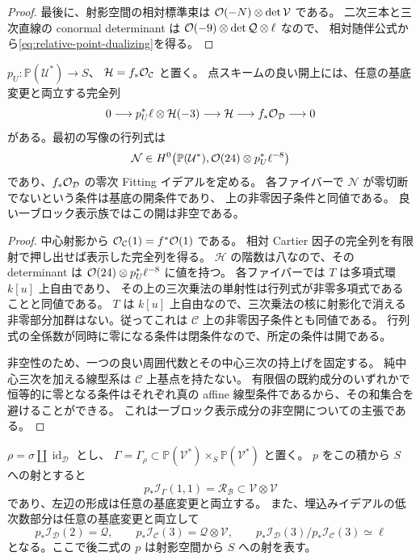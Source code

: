 \begin{proof}
最後に、射影空間の相対標準束は
$\mathcal O(-N)\otimes\det\mathcal V$ である。
二次三本と三次直線の conormal determinant は
$\mathcal O(-9)\otimes\det\mathcal Q\otimes\ell$ なので、
相対随伴公式から\eqref{eq:relative-point-dualizing}を得る。
\end{proof}

\begin{corollary}
\label{cor:relative-point-norm}
$p_U:\mathbb P(\mathcal U^*)\to S$、
$\mathcal H=f_*\mathcal O_{\mathcal C}$ と置く。
点スキームの良い開上には、任意の基底変更と両立する完全列
\[
 0\longrightarrow p_U^*\ell\otimes\mathcal H(-3)
 \longrightarrow\mathcal H
 \longrightarrow f_*\mathcal O_{\mathcal D}\longrightarrow0
\]
がある。最初の写像の行列式は
\[
 \mathcal N\in
 H^0\bigl(\mathbb P(\mathcal U^*),
       \mathcal O(24)\otimes p_U^*\ell^{-8}\bigr)
\]
であり、$f_*\mathcal O_{\mathcal D}$ の零次 Fitting イデアルを定める。
各ファイバーで $\mathcal N$ が零切断でないという条件は基底の開条件であり、
上の非零因子条件と同値である。
良い一ブロック表示族ではこの開は非空である。
\end{corollary}

\begin{proof}
中心射影から $\mathcal O_{\mathcal C}(1)=f^*\mathcal O(1)$ である。
相対 Cartier 因子の完全列を有限射で押し出せば表示した完全列を得る。
$\mathcal H$ の階数は八なので、その determinant は
$\mathcal O(24)\otimes p_U^*\ell^{-8}$ に値を持つ。
各ファイバーでは $T$ は多項式環 $k[u]$ 上自由であり、
その上の三次乗法の単射性は行列式が非零多項式であることと同値である。
$T$ は $k[u]$ 上自由なので、三次乗法の核に射影化で消える
非零部分加群はない。従ってこれは $\mathcal C$ 上の非零因子条件とも同値である。
行列式の全係数が同時に零になる条件は閉条件なので、所定の条件は開である。

非空性のため、一つの良い周囲代数とその中心三次の持上げを固定する。
純中心三次を加える線型系は $\mathcal C$ 上基点を持たない。
有限個の既約成分のいずれかで恒等的に零となる条件はそれぞれ真の affine
線型条件であるから、その和集合を避けることができる。
これは一ブロック表示成分の非空開についての主張である。
\end{proof}

\begin{proposition}[相対点対応からの二次包絡]
\label{prop:relative-point-envelope}
$\rho=\sigma\amalg\operatorname{id}_{\mathcal D}$ とし、
$\Gamma=\Gamma_\rho\subset
\mathbb P(\mathcal V^*)\times_S\mathbb P(\mathcal V^*)$ と置く。
$p$ をこの積から $S$ への射とすると
\begin{equation}\label{eq:relative-point-envelope}
 p_*\mathcal I_\Gamma(1,1)=\mathcal R_{\mathcal B}
 \subset\mathcal V\otimes\mathcal V
\end{equation}
であり、左辺の形成は任意の基底変更と両立する。
また、埋込みイデアルの低次数部分は任意の基底変更と両立して
\begin{equation}\label{eq:relative-point-ideal-pieces}
 p_*\mathcal I_{\mathcal D}(2)=\mathcal Q,
 \qquad
 p_*\mathcal I_{\mathcal C}(3)=\mathcal Q\otimes\mathcal V,
 \qquad
 p_*\mathcal I_{\mathcal D}(3)\big/
       p_*\mathcal I_{\mathcal C}(3)\simeq\ell
\end{equation}
となる。ここで後二式の $p$ は射影空間から $S$ への射を表す。
\end{proposition}

